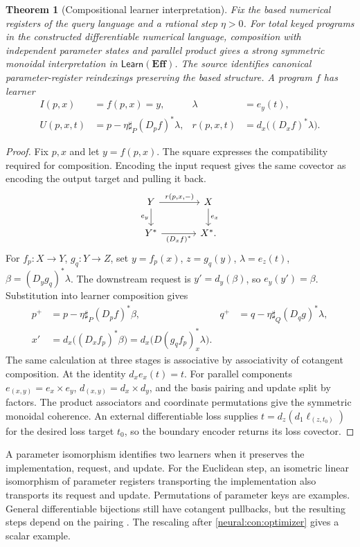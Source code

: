 \documentclass[11pt,a4paper]{article}
\newtheorem{theorem}{Theorem}[section]
\theoremstyle{definition}
\theoremstyle{remark}\newaliascnt{remark}{theorem}
\newcommand{\E}{\mathbf{Eff}}
\numberwithin{equation}{section}
\begin{document}
\begin{theorem}[Compositional learner interpretation]\label{thm:learner}
Fix the based numerical registers of the query language and a rational step $\eta>0$. For total keyed programs in the constructed differentiable numerical language, composition with independent parameter states and parallel product gives a strong symmetric monoidal interpretation in $\mathsf{Learn}(\E)$. The source identifies canonical parameter-register reindexings preserving the based structure. A program $f$ has learner
\[
 \begin{aligned}
 I(p,x)&=f(p,x)=y, &\lambda&=e_y(t),\\
 U(p,x,t)&=p-\eta\sharp_P (D_p f)^*\lambda,&
 r(p,x,t)&=d_x\big((D_x f)^*\lambda\big).
 \end{aligned}
\]
\end{theorem}
\begin{proof}
Fix $p,x$ and let $y=f(p,x)$. The square expresses the compatibility required for composition. Encoding the input request gives the same covector as encoding the output target and pulling it back.
\[
\begin{tikzcd}[column sep=large]
 Y\arrow[r,"{r(p,x,-)}"]\arrow[d,"e_y"']&X\arrow[d,"e_x"]\\
 Y^*\arrow[r,"{(D_x f)^*}"']&X^* .
\end{tikzcd}
\]
For \(f_p:X\to Y\), \(g_q:Y\to Z\), set \(y=f_p(x)\), \(z=g_q(y)\), \(\lambda=e_z(t)\), \(\beta=(D_y g_q)^*\lambda\). The downstream request is \(y'=d_y(\beta)\), so \(e_y(y')=\beta\). Substitution into learner composition gives
\[
\begin{aligned}
 p^+&=p-\eta\sharp_P(D_pf)^*\beta,&
 q^+&=q-\eta\sharp_Q(D_qg)^*\lambda,\\
 x'&=d_x\big((D_xf_p)^*\beta\big)
    =d_x\big(D(g_qf_p)_x^*\lambda\big).
\end{aligned}
\]
The same calculation at three stages is associative by associativity of cotangent composition. At the identity \(d_x e_x(t)=t\). For parallel components \(e_{(x,y)}=e_x\times e_y\), \(d_{(x,y)}=d_x\times d_y\), and the basis pairing and update split by factors. The product associators and coordinate permutations give the symmetric monoidal coherence. An external differentiable loss supplies \(t=d_z(d_1\ell_{(z,t_0)})\) for the desired loss target \(t_0\), so the boundary encoder returns its loss covector.
\end{proof}

A parameter isomorphism identifies two learners when it preserves the implementation, request, and update. For the Euclidean step, an isometric linear isomorphism of parameter registers transporting the implementation also transports its request and update. Permutations of parameter keys are examples. General differentiable bijections still have cotangent pullbacks, but the resulting steps depend on the pairing \cite{lens:deep}. The rescaling after \cref{neural:con:optimizer} gives a scalar example.
\end{document}
